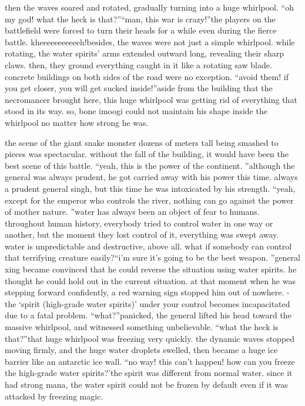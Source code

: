  then the waves soared and rotated, gradually turning into a huge whirlpool.
“oh my god! what the heck is that?”“man, this war is crazy!”the players on the battlefield were forced to turn their heads for a while even during the fierce battle.
kheeeeeeeeeeeh!besides, the waves were not just a simple whirlpool.
 while rotating, the water spirits’ arms extended outward long, revealing their sharp claws.
then, they ground everything caught in it like a rotating saw blade.
 concrete buildings on both sides of the road were no exception.
“avoid them! if you get closer, you will get sucked inside!”aside from the building that the necromancer brought here, this huge whirlpool was getting rid of everything that stood in its way.
so, bone imoogi could not maintain his shape inside the whirlpool no matter how strong he was.


the scene of the giant snake monster dozens of meters tall being smashed to pieces was spectacular.
 without the fall of the building, it would have been the best scene of this battle.
“yeah, this is the power of the continent.
”although the general was always prudent, he got carried away with his power this time.
always a prudent general singh, but this time he was intoxicated by his strength.
“yeah, except for the emperor who controls the river, nothing can go against the power of mother nature.
”water has always been an object of fear to humans.
 throughout human history, everybody tried to control water in one way or another, but the moment they lost control of it, everything was swept away.
water is unpredictable and destructive, above all.
 what if somebody can control that terrifying creature easily?“i’m sure it’s going to be the best weapon.
”general xing became convinced that he could reverse the situation using water spirits.
 he thought he could hold out in the current situation.
at that moment when he was stepping forward confidently, a red warning sign stopped him out of nowhere.
-the ‘spirit (high-grade water spirits)’ under your control becomes incapacitated due to a fatal problem.
“what?”panicked, the general lifted his head toward the massive whirlpool, and witnessed something unbelievable.
“what the heck is that?”that huge whirlpool was freezing very quickly.
 the dynamic waves stopped moving firmly, and the huge water droplets swelled, then became a huge ice barrier like an antarctic ice wall.
“no way! this can’t happen! how can you freeze the high-grade water spirits?’the spirit was different from normal water.
 since it had strong mana, the water spirit could not be frozen by default even if it was attacked by freezing magic.


 